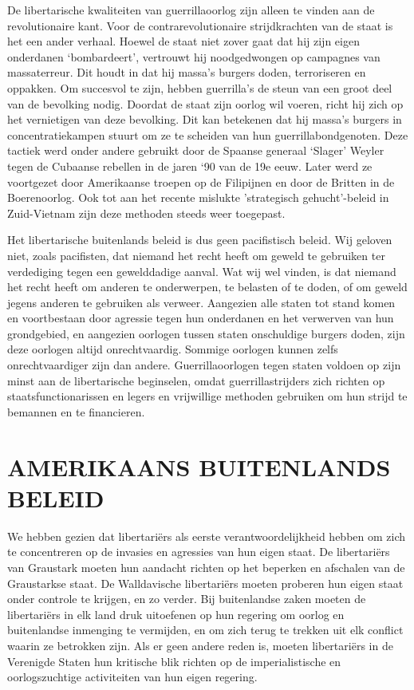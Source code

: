 \documentclass[
  a5paper,
  smalldemyvopaper,10pt,twoside,onecolumn,openright,extrafontsizes,hidelinks]{memoir}
\begin{document}
De libertarische kwaliteiten van guerrillaoorlog zijn alleen te vinden
aan de revolutionaire kant. Voor de contrarevolutionaire strijdkrachten
van de staat is het een ander verhaal. Hoewel de staat niet zover gaat
dat hij zijn eigen onderdanen `bombardeert', vertrouwt hij noodgedwongen
op campagnes van massaterreur. Dit houdt in dat hij massa's burgers
doden, terroriseren en oppakken. Om succesvol te zijn, hebben
guerrilla's de steun van een groot deel van de bevolking nodig. Doordat
de staat zijn oorlog wil voeren, richt hij zich op het vernietigen van
deze bevolking. Dit kan betekenen dat hij massa's burgers in
concentratiekampen stuurt om ze te scheiden van hun
guerrillabondgenoten. Deze tactiek werd onder andere gebruikt door de
Spaanse generaal `Slager' Weyler tegen de Cubaanse rebellen in de jaren
`90 van de 19e eeuw. Later werd ze voortgezet door Amerikaanse troepen
op de Filipijnen en door de Britten in de Boerenoorlog. Ook tot aan het
recente mislukte 'strategisch gehucht'-beleid in Zuid-Vietnam zijn deze
methoden steeds weer toegepast.

Het libertarische buitenlands beleid is dus geen pacifistisch beleid.
Wij geloven niet, zoals pacifisten, dat niemand het recht heeft om
geweld te gebruiken ter verdediging tegen een gewelddadige aanval. Wat
wij wel vinden, is dat niemand het recht heeft om anderen te
onderwerpen, te belasten of te doden, of om geweld jegens anderen te
gebruiken als verweer. Aangezien alle staten tot stand komen en
voortbestaan door agressie tegen hun onderdanen en het verwerven van hun
grondgebied, en aangezien oorlogen tussen staten onschuldige burgers
doden, zijn deze oorlogen altijd onrechtvaardig. Sommige oorlogen kunnen
zelfs onrechtvaardiger zijn dan andere. Guerrillaoorlogen tegen staten
voldoen op zijn minst aan de libertarische beginselen, omdat
guerrillastrijders zich richten op staatsfunctionarissen en legers en
vrijwillige methoden gebruiken om hun strijd te bemannen en te
financieren.

\section{AMERIKAANS BUITENLANDS
BELEID}\label{amerikaans-buitenlands-beleid}

We hebben gezien dat libertariërs als eerste verantwoordelijkheid hebben
om zich te concentreren op de invasies en agressies van hun eigen staat.
De libertariërs van Graustark moeten hun aandacht richten op het
beperken en afschalen van de Graustarkse staat. De Walldavische
libertariërs moeten proberen hun eigen staat onder controle te krijgen,
en zo verder. Bij buitenlandse zaken moeten de libertariërs in elk land
druk uitoefenen op hun regering om oorlog en buitenlandse inmenging te
vermijden, en om zich terug te trekken uit elk conflict waarin ze
betrokken zijn. Als er geen andere reden is, moeten libertariërs in de
Verenigde Staten hun kritische blik richten op de imperialistische en
oorlogszuchtige activiteiten van hun eigen regering.
\end{document}
